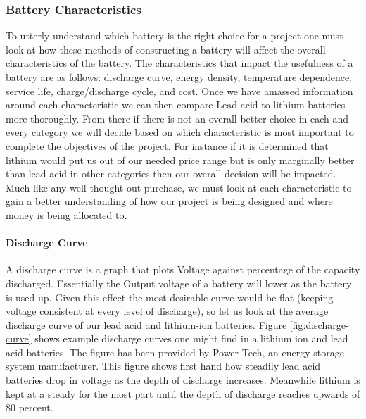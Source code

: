 \subsubsection{Battery Characteristics}
To utterly understand which battery is the right choice for a project one must look at how these methods of constructing a battery will affect the overall characteristics of the battery. The characteristics that impact the usefulness of a battery are as follows: discharge curve, energy density, temperature dependence, service life, charge/discharge cycle, and cost. Once we have amassed information around each characteristic we can then compare Lead acid to lithium batteries more thoroughly. From there if there is not an overall better choice in each and every category we will decide based on which characteristic is most important to complete the objectives of the project. For instance if it is determined that lithium would put us out of our needed price range but is only marginally better than lead acid in other categories then our overall decision will be impacted. Much like any well thought out purchase, we must look at each characteristic to gain a better understanding of how our project is being designed and where money is being allocated to.

\paragraph{Discharge Curve}
A discharge curve is a graph that plots Voltage against percentage of the capacity discharged. Essentially the Output voltage of a battery will lower as the battery is used up. Given this effect the most desirable curve would be flat (keeping voltage consistent at every level of discharge), so let us look at the average discharge curve of our lead acid and lithium-ion batteries. Figure \ref{fig:discharge-curve} shows example discharge curves one might find in a lithium ion and lead acid batteries. The figure has been provided by Power Tech, an energy storage system manufacturer. This figure shows first hand how steadily lead acid batteries drop in voltage as the depth of discharge increases. Meanwhile lithium is kept at a steady for the most part until the depth of discharge reaches upwards of 80 percent.

